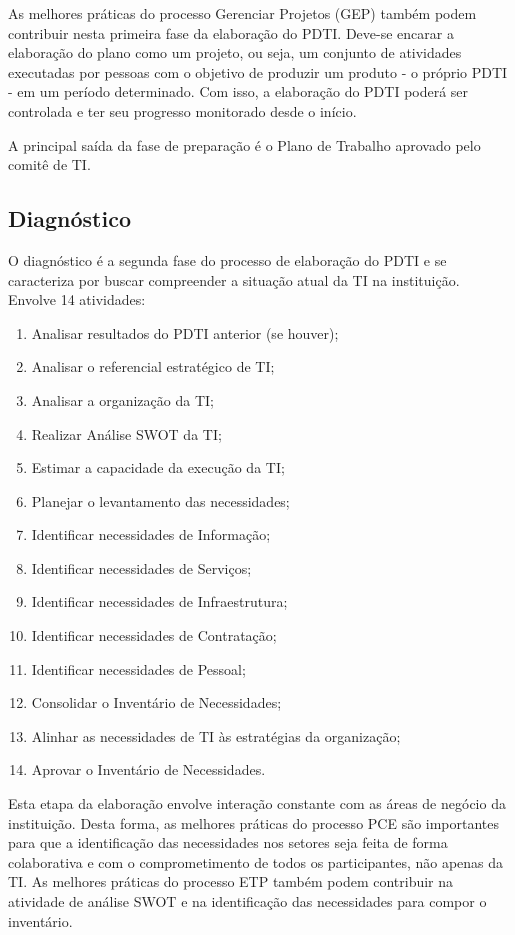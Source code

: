 As melhores práticas do processo Gerenciar Projetos (GEP) também podem contribuir nesta primeira fase da elaboração do PDTI. Deve-se encarar a elaboração do plano como um projeto, ou seja, um conjunto de atividades executadas por pessoas com o objetivo de produzir um produto - o próprio PDTI - em um período determinado. Com isso, a elaboração do PDTI poderá ser controlada e ter seu progresso monitorado desde o início.

A principal saída da fase de preparação é o Plano de Trabalho aprovado pelo comitê de TI.

\subsection{Diagnóstico}

O diagnóstico é a segunda fase do processo de elaboração do PDTI e se caracteriza por buscar compreender a situação atual da TI na instituição. Envolve 14 atividades:
\begin{enumerate}
\item Analisar resultados do PDTI anterior (se houver);
\item Analisar o referencial estratégico de TI;
\item Analisar a organização da TI;
\item Realizar Análise SWOT da TI;
\item Estimar a capacidade da execução da TI;
\item Planejar o levantamento das necessidades;
\item Identificar necessidades de Informação;
\item Identificar necessidades de Serviços;
\item Identificar necessidades de Infraestrutura;
\item Identificar necessidades de Contratação;
\item Identificar necessidades de Pessoal;
\item Consolidar o Inventário de Necessidades;
\item Alinhar as necessidades de TI às estratégias da organização;
\item Aprovar o Inventário de Necessidades.
\end{enumerate}

Esta etapa da elaboração envolve interação constante com as áreas de negócio da instituição. Desta forma, as melhores práticas do processo PCE são importantes para que a identificação das necessidades nos setores seja feita de forma colaborativa e com o comprometimento de todos os participantes, não apenas da TI. As melhores práticas do processo ETP também podem contribuir na atividade de análise SWOT e na identificação das necessidades para compor o inventário.

